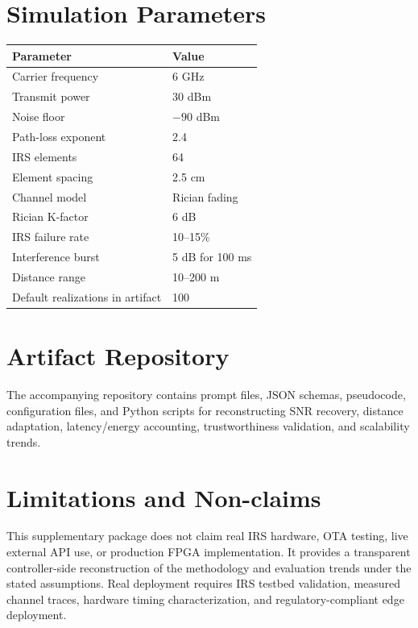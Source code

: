 \documentclass[11pt]{article}
\begin{document}
\section{Simulation Parameters}
\begin{center}
\begin{tabular}{ll}
\toprule
Parameter & Value \\
\midrule
Carrier frequency & 6 GHz \\
Transmit power & 30 dBm \\
Noise floor & $-90$ dBm \\
Path-loss exponent & 2.4 \\
IRS elements & 64 \\
Element spacing & 2.5 cm \\
Channel model & Rician fading \\
Rician K-factor & 6 dB \\
IRS failure rate & 10--15\% \\
Interference burst & 5 dB for 100 ms \\
Distance range & 10--200 m \\
Default realizations in artifact & 100 \\
\bottomrule
\end{tabular}
\end{center}

\section{Artifact Repository}
The accompanying repository contains prompt files, JSON schemas, pseudocode, configuration files, and Python scripts for reconstructing SNR recovery, distance adaptation, latency/energy accounting, trustworthiness validation, and scalability trends.

\section{Limitations and Non-claims}
This supplementary package does not claim real IRS hardware, OTA testing, live external API use, or production FPGA implementation. It provides a transparent controller-side reconstruction of the methodology and evaluation trends under the stated assumptions. Real deployment requires IRS testbed validation, measured channel traces, hardware timing characterization, and regulatory-compliant edge deployment.
\end{document}
